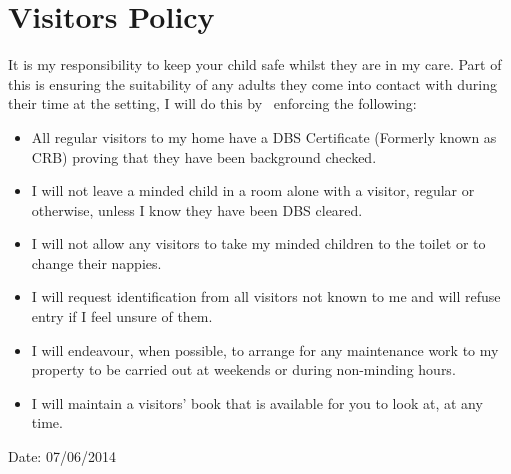 \documentclass[10pt]{article}
\begin{document}
\section{Visitors Policy}

It is my responsibility to keep your child safe whilst they are in my
care. Part of this is ensuring the suitability of any adults they come
into contact with during their time at the setting, I will do this by
~enforcing the following:

\begin{itemize}
\item
  All regular visitors to my home have a DBS Certificate (Formerly
  known as CRB) proving that they have been background checked. ~
\end{itemize}

\begin{itemize}
\item
  I will not leave a minded child in a room alone with a visitor,
  regular or otherwise, unless I know they have been DBS cleared.~
\item
  I will not allow any visitors to take my minded children to the
  toilet or to change their nappies.~
\end{itemize}

\begin{itemize}
\item
  I will request identification from all visitors not known to me and
  will refuse entry if I feel unsure of them. ~
\end{itemize}

\begin{itemize}
\item
  I will endeavour, when possible, to arrange for any maintenance work
  to my property to be carried out at weekends or during non-minding
  hours. ~
\end{itemize}

\begin{itemize}
\item
  I will maintain a visitors' book that is available for you to look
  at, at any time.~
\end{itemize}

Date: 07/06/2014

~
\end{document}
